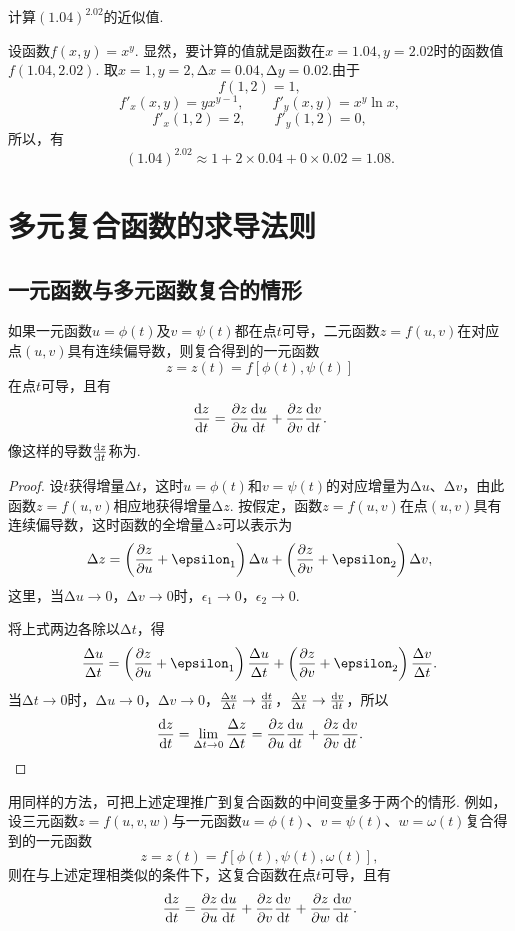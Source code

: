 \begin{example}
计算\((1.04)^{2.02}\)的近似值.
\begin{solution}
设函数\(f(x,y) = x^y\).
显然，要计算的值就是函数在\(x=1.04,y=2.02\)时的函数值\(f(1.04,2.02)\).
取\(x=1,y=2,\increment x=0.04,\increment y=0.02\).由于\[
f(1,2)=1,
\]\[
f'_x(x,y) = y x^{y-1}, \qquad f'_y(x,y) = x^y \ln x,
\]\[
f'_x(1,2) = 2, \qquad f'_y(1,2) = 0,
\]所以，有\[
(1.04)^{2.02} \approx 1 + 2 \times 0.04 + 0 \times 0.02 = 1.08.
\]
\end{solution}
\end{example}

\section{多元复合函数的求导法则}
\subsection{一元函数与多元函数复合的情形}
\begin{theorem}
如果一元函数\(u=\phi(t)\)及\(v=\psi(t)\)都在点\(t\)可导，二元函数\(z=f(u,v)\)在对应点\((u,v)\)具有连续偏导数，则复合得到的一元函数\[
z = z(t) = f[\phi(t),\psi(t)]
\]在点\(t\)可导，且有\[
\dv{z}{t} = \pdv{z}{u}\dv{u}{t} + \pdv{z}{v}\dv{v}{t}.
\]
像这样的导数\(\dv{z}{t}\)称为.
\begin{proof}
\def\D#1#2{\frac{\increment #1}{\increment #2}}
设\(t\)获得增量\(\increment t\)，这时\(u=\phi(t)\)和\(v=\psi(t)\)的对应增量为\(\increment u\)、\(\increment v\)，由此函数\(z=f(u,v)\)相应地获得增量\(\increment z\).
按假定，函数\(z=f(u,v)\)在点\((u,v)\)具有连续偏导数，这时函数的全增量\(\increment z\)可以表示为
\[
\increment z = \left(\pdv{z}{u} + \epsilon_1\right) \increment u + \left(\pdv{z}{v} + \epsilon_2\right) \increment v,
\]这里，当\(\increment u\to0\)，\(\increment v\to0\)时，\(\epsilon_1\to0\)，\(\epsilon_2\to0\).

将上式两边各除以\(\increment t\)，得\[
\D{u}{t} = \left(\pdv{z}{u} + \epsilon_1\right) \D{u}{t} + \left(\pdv{z}{v} + \epsilon_2\right) \D{v}{t}.
\]当\(\increment t\to0\)时，\(\increment u\to0\)，\(\increment v\to0\)，\(\D{u}{t} \to \dv{t}{t}\)，\(\D{v}{t} \to \dv{v}{t}\)，所以\[
\dv{z}{t} = \lim\limits_{\increment t\to0}{\D{z}{t}}
= \pdv{z}{u} \dv{u}{t} + \pdv{z}{v} \dv{v}{t}.
\qedhere
\]
\end{proof}
\end{theorem}
用同样的方法，可把上述定理推广到复合函数的中间变量多于两个的情形.
例如，设三元函数\(z=f(u,v,w)\)与一元函数\(u=\phi(t)\)、\(v=\psi(t)\)、\(w=\omega(t)\)复合得到的一元函数\[
z = z(t) = f[\phi(t),\psi(t),\omega(t)],
\]则在与上述定理相类似的条件下，这复合函数在点\(t\)可导，且有\[
\dv{z}{t} = \pdv{z}{u}\dv{u}{t} + \pdv{z}{v}\dv{v}{t} + \pdv{z}{w}\dv{w}{t}.
\]

